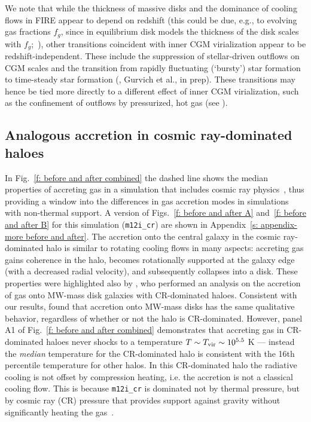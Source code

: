 \documentclass[fleqn,usenatbib]{mnras}
\begin{document}
We note that while the thickness of massive disks and the dominance of cooling flows in FIRE appear to depend on redshift (this could be due, e.g., to evolving gas fractions $f_g$, since in equilibrium disk models the thickness of the disk scales with $f_g$;~\citealt{Thompson2005, Faucher-Giguere2013}), other transitions coincident with inner CGM virialization appear to be redshift-independent.
These include the suppression of stellar-driven outflows on CGM scales and the transition from rapidly fluctuating (`bursty') star formation to time-steady star formation (\citealt{Stern2021, Yu2021}, Gurvich et al., in prep).
These transitions may hence be tied more directly to a different effect of inner CGM virialization, such as the confinement of outflows by pressurized, hot gas (see \citealt{Stern2021}). 

\subsection{Analogous accretion in cosmic ray-dominated haloes}
\label{s: crs}

In Fig.~\ref{f: before and after combined} the dashed line shows the median properties of accreting gas in a simulation that includes cosmic ray physics~\citep[][]{Chan2019, Hopkins2020a}, thus providing a window into the differences in gas accretion modes in simulations with non-thermal support.
A version of Figs.~\ref{f: before and after A} and~\ref{f: before and after B} for this simulation (\texttt{m12i\_cr}) are shown in Appendix~\ref{s: appendix-more before and after}.
The accretion onto the central galaxy in the cosmic ray-dominated halo is similar to rotating cooling flows in many aspects:
accreting gas gains coherence in the halo, becomes rotationally supported at the galaxy edge (with a decreased radial velocity), and subsequently collapses into a disk.
These properties were highlighted also by \cite{Trapp2021}, who performed an analysis on the accretion of gas onto MW-mass disk galaxies with CR-dominated haloes.
Consistent with our results, \citeauthor{Trapp2021} found that accretion onto MW-mass disks has the same qualitative behavior, regardless of whether or not the halo is CR-dominated.
However, panel A1 of Fig.~\ref{f: before and after combined} demonstrates that accreting gas in CR-dominated haloes never shocks to a temperature $T \sim T_{\rm vir} \sim 10^{5.5}$ K --- instead the \textit{median} temperature for the CR-dominated halo is consistent with the 16th percentile temperature for other halos.
In this CR-dominated halo the radiative cooling is not offset by compression heating, i.e. the accretion is not a classical cooling flow.
This is because \texttt{m12i\_cr} is dominated not by thermal pressure, but by cosmic ray (CR) pressure that provides support against gravity without significantly heating the gas~\citep{Ji2020}.
\end{document}
